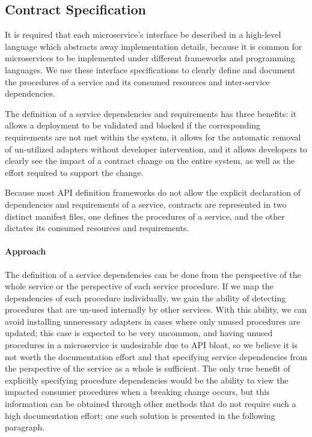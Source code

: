 \subsection{Contract Specification} %
\label{sec:contract_specification}

It is required that each microservice’s interface be
described in a high-level language which abstracts away implementation details, because it is common
for microservices to be implemented under different frameworks and programming languages.
We use these interface specifications to clearly define and document the procedures of a service and its consumed resources and inter-service dependencies.

The definition of a service dependencies and requirements has three benefits: it allows a deployment to be validated and blocked if the corresponding requirements are not met within the system,
it allows for the automatic removal of un-utilized adapters without developer intervention,
and it allows developers to clearly see the impact of a contract change on the entire system, as well as the effort required to support the change.

Because most API definition frameworks do not allow the explicit declaration of dependencies and requirements of a service,
contracts are represented in two distinct manifest files, one defines the procedures of a service, and the other dictates its consumed resources and requirements.

\paragraph{Approach}
The definition of a service dependencies can be done from the perspective of the whole service or the perspective of each service procedure.
If we map the dependencies of each procedure individually, we gain the ability of detecting procedures that are un-used internally by other services.
With this ability, we can avoid installing unnecessary adapters in cases where only unused procedures are updated;
this case is expected to be very uncommon, and having unused procedures in a microservice is undesirable due to API bloat,
so we believe it is not worth the documentation effort and that specifying service dependencies from the perspective of the service as a whole is sufficient.
The only true benefit of explicitly specifying procedure dependencies would be the ability to view the impacted consumer procedures when a breaking change occurs,
but this information can be obtained through other methods that do not require such a high documentation effort;
one such solution is presented in the following paragraph.

